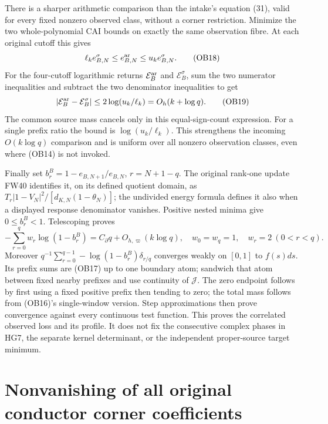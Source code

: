 \documentclass[11pt]{article}
\theoremstyle{remark}\newtheorem{remark}[theorem]{Remark}
\begin{document}
There is a sharper arithmetic comparison than the intake's equation
(31), valid for every fixed nonzero observed class, without a corner
restriction. Minimize the two whole-polynomial CAI bounds on exactly
the same observation fibre. At each original cutoff this gives
\[
 \ell_ke_{B,N}^\sigma\le e_{B,N}^{\rm ar}\le u_ke_{B,N}^\sigma.
 \tag{OB18}
\]
For the four-cutoff logarithmic returns $\mathcal E_B^{\rm ar}$ and
$\mathcal E_B^\sigma$, sum the two numerator inequalities and subtract
the two denominator inequalities to get
\[
 |\mathcal E_B^{\rm ar}-\mathcal E_B^\sigma|
 \le2\log(u_k/\ell_k)=O_h(k+\log q).\tag{OB19}
\]
The common source mass cancels only in this equal-sign-count expression.
For a single prefix ratio the bound is $\log(u_k/\ell_k)$. This
strengthens the incoming $O(k\log q)$ comparison and is uniform over
all nonzero observation classes, even where (OB14) is not invoked.

Finally set $b_r^B=1-e_{B,N+1}/e_{B,N}$, $r=N+1-q$. The original
rank-one update FW40 identifies it, on its defined quotient domain, as
$T_r|1-V_N|^2/[d_{K,N}(1-\theta_N)]$; the undivided energy formula
defines it also when a displayed response denominator vanishes.
Positive nested minima give $0\le b_r^B<1$. Telescoping proves
\[
 -\sum_{r=0}^{q}w_r\log(1-b_r^B)
 =C_\partial q+O_{h,\varpi}(k\log q),\quad
 w_0=w_q=1,\quad w_r=2\ (0<r<q).\tag{OB20}
\]
Moreover $q^{-1}\sum_{r=0}^{q-1}-\log(1-b_r^B)\delta_{r/q}$
converges weakly on $[0,1]$ to $f(s)ds$. Its prefix sums are (OB17)
up to one boundary atom; sandwich that atom between fixed nearby
prefixes and use continuity of $\mathcal J$. The zero endpoint follows
by first using a fixed positive prefix then tending to zero; the total
mass follows from (OB16)'s single-window version. Step approximations
then prove convergence against every continuous test function.
This proves the correlated observed loss and its profile. It does not
fix the consecutive complex phases in HG7, the separate kernel
determinant, or the independent proper-source target minimum.

\section{Nonvanishing of all original conductor corner coefficients}
\label{sec:OC-original-corners}
\end{document}
